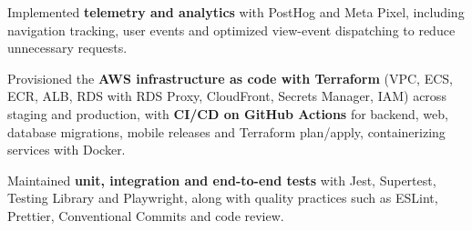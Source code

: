 \begin{cventries}
{\begin{cvitems}
        \item {Implemented \textbf{telemetry and analytics} with PostHog and Meta Pixel, including navigation tracking, user events and optimized view-event dispatching to reduce unnecessary requests.}
        \item {Provisioned the \textbf{AWS infrastructure as code with Terraform} (VPC, ECS, ECR, ALB, RDS with RDS Proxy, CloudFront, Secrets Manager, IAM) across staging and production, with \textbf{CI/CD on GitHub Actions} for backend, web, database migrations, mobile releases and Terraform plan/apply, containerizing services with Docker.}
        \item {Maintained \textbf{unit, integration and end-to-end tests} with Jest, Supertest, Testing Library and Playwright, along with quality practices such as ESLint, Prettier, Conventional Commits and code review.}
      \end{cvitems}
    }


\end{cventries}
